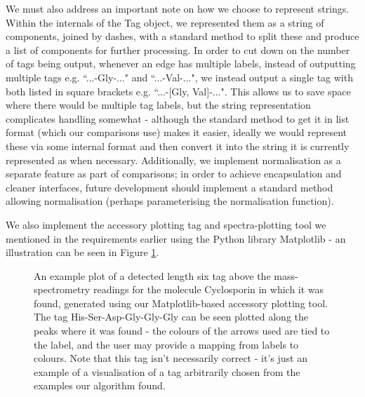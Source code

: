 \documentclass{l4proj}
\newcommand{\cit}[1]{\citep{#1}}
\begin{document}
We must also address an important note on how we choose to represent strings. Within the internals of the Tag object, we represented them as a string of components, joined by dashes, with a standard method to split these and produce a list of components for further processing. In order to cut down on the number of tags being output, whenever an edge has multiple labels, instead of outputting multiple tags e.g. ``...-Gly-..." and ``...-Val-...", we instead output a single tag with both listed in square brackets e.g. ``...-[Gly, Val]-...". This allows us to save space where there would be multiple tag labels, but the string representation complicates handling somewhat - although the standard method to get it in list format (which our comparisons use) makes it easier, ideally we would represent these via some internal format and then convert it into the string it is currently represented as when necessary. Additionally, we implement normalisation as a separate feature as part of comparisons; in order to achieve encapsulation and cleaner interfaces, future development should implement a standard method allowing normalisation (perhaps parameterising the normalisation function).

We also implement the accessory plotting tag and spectra-plotting tool we mentioned in the requirements earlier using the Python library Matplotlib \cit{matplotlib} - an illustration can be seen in Figure \ref{fig:spectragraph}.

\begin{figure} \label{fig:spectragraph}
    \centering

    \caption{An example plot of a detected length six tag above the mass-spectrometry readings for the molecule Cyclosporin in which it was found, generated using our Matplotlib-based accessory plotting tool. The tag His-Ser-Asp-Gly-Gly-Gly can be seen plotted along the peaks where it was found - the colours of the arrows used are tied to the label, and the user may provide a mapping from labels to colours. Note that this tag isn't necessarily correct - it's just an example of a visualisation of a tag arbitrarily chosen from the examples our algorithm found.}

    \label{fig:spectragraph}
\end{figure}
\end{document}
